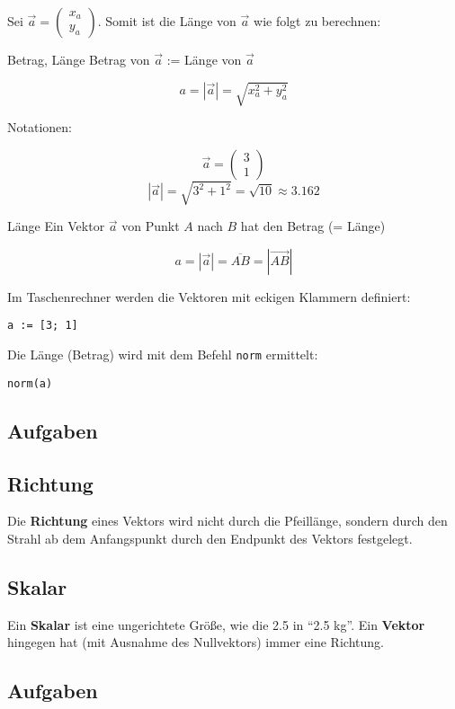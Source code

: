 Sei $\vec{a}  = \begin{pmatrix}x_a\\y_a\end{pmatrix}$. Somit ist die Länge von
    $\vec{a}$ wie folgt zu berechnen:

    \begin{gesetz}{Betrag, Länge}{}
      Betrag von $\vec{a}$ := Länge von $\vec{a}$

      $$a = |\vec{a}| = \sqrt{x_a^2 + y_a^2}$$
      \end{gesetz}
    Notationen:

    \begin{beispiel}{}{}
      $$ \vec{a}= \begin{pmatrix} 3\\ 1\end{pmatrix}$$
        $$|\vec{a}| = \sqrt{3^2+1^2} = \sqrt{10}\approx 3.162$$
      \end{beispiel}
    
    \begin{definition}{Länge}{}
      Ein Vektor $\vec{a}$ von Punkt $A$ nach $B$ hat den Betrag (= Länge)

      $$a = |\vec{a}| = \overline{AB} = \left|\overrightarrow{AB}\right|$$
    \end{definition}

    \begin{bemerkung}{}{}
      Im Taschenrechner werden die Vektoren mit eckigen Klammern
      definiert:

      \texttt{a := [3; 1]}

      Die Länge (Betrag) wird mit dem Befehl \texttt{norm} ermittelt:

      \texttt{norm(a)}
    \end{bemerkung}
        
\subsection*{Aufgaben}    
\newpage

\subsection{Richtung}
Die \textbf{Richtung} eines Vektors wird nicht durch die Pfeillänge,
sondern durch den Strahl ab dem Anfangspunkt durch den Endpunkt des
Vektors festgelegt.


\subsection{Skalar}
Ein \textbf{Skalar} ist eine ungerichtete Größe, wie \zB die 2.5 in
``2.5 kg''.
Ein \textbf{Vektor} hingegen hat (mit Ausnahme des Nullvektors) immer
eine Richtung.

\subsection*{Aufgaben}
